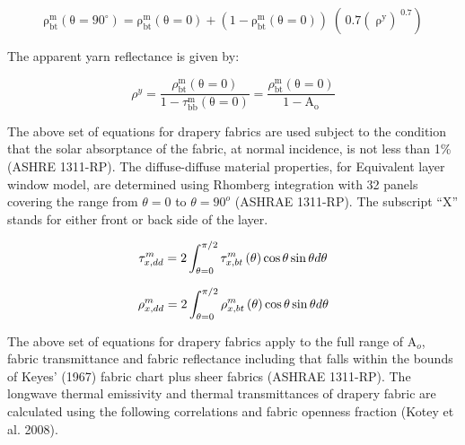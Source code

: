 \begin{equation}
{\mathrm{\rho }}_{{\mathrm{bt}}}^{\mathrm{m}}\left( {{\mathrm{\theta }} = {\mathrm{90}}^\circ } \right) = {\mathrm{\rho }}_{{\mathrm{bt}}}^{\mathrm{m}}\left( {{\mathrm{\theta }} = {\mathrm{0}}} \right) + \left( {{\mathrm{1}} - {\mathrm{\rho }}_{{\mathrm{bt}}}^{\mathrm{m}}\left( {{\mathrm{\theta }} = {\mathrm{0}}} \right)} \right)\;\left( {\,0.7{{\left( {\;{\mathrm{\rho }}_{}^{\mathrm{y}}} \right)}^{\;0.7}}} \right)
\end{equation}

The apparent yarn reflectance is given by:

\begin{equation}
{\rho ^y} = \frac{{\rho_{{\mathrm{bt}}}^{\mathrm{m}}\left( {{\mathrm{\theta }} = {\mathrm{0}}} \right)}}{{{\mathrm{1}} - \tau_{{\mathrm{bb}}}^{\mathrm{m}}\left( {{\mathrm{\theta }} = {\mathrm{0}}} \right)}} = \frac{{\rho_{{\mathrm{bt}}}^{\mathrm{m}}\left( {{\mathrm{\theta }} = {\mathrm{0}}} \right)}}{{{\mathrm{1}} - {{\mathrm{A}}_{\mathrm{o}}}}}
\end{equation}

The above set of equations for drapery fabrics are used subject to the condition that the solar absorptance of the fabric, at normal incidence, is not less than 1\% (ASHRE 1311-RP). The diffuse-diffuse material properties, for Equivalent layer window model, are determined using Rhomberg integration with 32 panels covering the range from $\theta = 0$ to $\theta = 90^{o}$ (ASHRAE 1311-RP). The subscript ``X'' stands for either front or back side of the layer.

\begin{equation}
  \tau_{x,dd}^{m} = 2\int_{\theta=0}^{\pi/2}\tau_{x,bt}^{m}\left(\theta\right)\cos\theta\sin\theta d\theta
\end{equation}

\begin{equation}
  \rho_{x,dd}^{m} = 2\int_{\theta=0}^{\pi/2}\rho_{x,bt}^{m}\left(\theta\right)\cos\theta\sin\theta d\theta
\end{equation}

The above set of equations for drapery fabrics apply to the full range of A\(_{o}\), fabric transmittance and fabric reflectance including that falls within the bounds of Keyes' (1967) fabric chart plus sheer fabrics (ASHRAE 1311-RP). The longwave thermal emissivity and thermal transmittances of drapery fabric are calculated using the following correlations and fabric openness fraction (Kotey et al. 2008).

